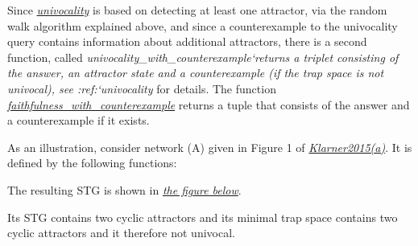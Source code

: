 \documentclass[letterpaper,10pt,english]{sphinxmanual}
\begin{document}
Since {\hyperref[AttractorDetection:univocality]{\emph{univocality}}} is based on detecting at least one attractor, via the random walk algorithm explained above,
and since a counterexample to the univocality query contains information about additional attractors,
there is a second function, called \emph{univocality\_with\_counterexample{}`returns a triplet consisting of the answer, an attractor state and a counterexample (if the trap space is not univocal),
see :ref:{}`univocality} for details.
The function {\hyperref[AttractorDetection:faithfulness-with-counterexample]{\emph{faithfulness\_with\_counterexample}}} returns a tuple that consists of the answer and a counterexample if it exists.

As an illustration, consider network (A) given in Figure 1 of {\hyperref[Bibliography:klarner2015trap]{\emph{Klarner2015(a)}}}.
It is defined by the following functions:

The resulting STG is shown in {\hyperref[Manual:figure25]{\emph{the figure below}}}.

Its STG contains two cyclic attractors and its minimal trap space \code{-{-}-} contains two cyclic attractors and it therefore not univocal.
\end{document}
